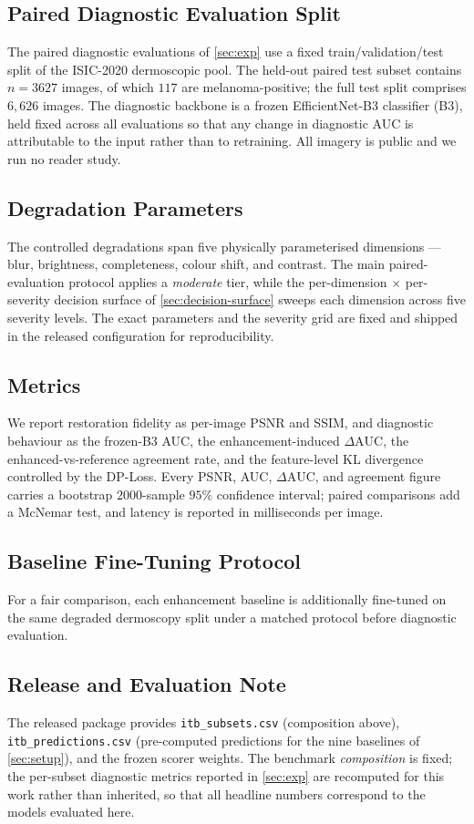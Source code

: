 \subsection{Paired Diagnostic Evaluation Split}\label{app:a4-split}
The paired diagnostic evaluations of \cref{sec:exp} use a fixed train/validation/test split of the
ISIC-2020 dermoscopic pool. The held-out paired test subset contains $n=3627$ images, of which $117$
are melanoma-positive; the full test split comprises $6{,}626$ images. The diagnostic backbone is a
frozen EfficientNet-B3 classifier (B3), held fixed across all evaluations so that any change in
diagnostic AUC is attributable to the input rather than to retraining. All imagery is public and we
run no reader study.

\subsection{Degradation Parameters}\label{app:a4-degrade-params}
The controlled degradations span five physically parameterised dimensions --- blur, brightness,
completeness, colour shift, and contrast. The main paired-evaluation protocol applies a
\emph{moderate} tier, while the per-dimension $\times$ per-severity decision surface of
\cref{sec:decision-surface} sweeps each dimension across five severity levels. The exact parameters
and the severity grid are fixed and shipped in the released configuration for reproducibility.

\subsection{Metrics}\label{app:a4-metrics}
We report restoration fidelity as per-image PSNR and SSIM, and diagnostic behaviour as the frozen-B3
AUC, the enhancement-induced $\Delta\mathrm{AUC}$, the enhanced-vs-reference agreement rate, and the
feature-level KL divergence controlled by the DP-Loss. Every PSNR, AUC, $\Delta\mathrm{AUC}$, and
agreement figure carries a bootstrap $2000$-sample $95\%$ confidence interval; paired comparisons add
a McNemar test, and latency is reported in milliseconds per image.

\subsection{Baseline Fine-Tuning Protocol}\label{app:a4-ft}
For a fair comparison, each enhancement baseline is additionally fine-tuned on the same degraded
dermoscopy split under a matched protocol before diagnostic evaluation.

\subsection{Release and Evaluation Note}\label{app:a4-release}
The released package provides \texttt{itb\_subsets.csv} (composition above),
\texttt{itb\_predictions.csv} (pre-computed predictions for the nine baselines of
\cref{sec:setup}), and the frozen scorer weights. The benchmark \emph{composition} is fixed; the
per-subset diagnostic metrics reported in \cref{sec:exp} are recomputed for this work rather than
inherited, so that all headline numbers correspond to the models evaluated here.
